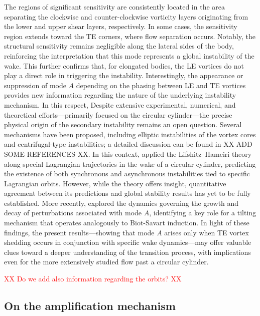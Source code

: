 %
The regions of significant sensitivity are consistently located in the area separating the clockwise and counter-clockwise vorticity layers originating from the lower and upper shear layers, respectively. In some cases, the sensitivity region extends toward the TE corners, where flow separation occurs. Notably, the structural sensitivity remains negligible along the lateral sides of the body, reinforcing the interpretation that this mode represents a global instability of the wake. This further confirms that, for elongated bodies, the LE vortices do not play a direct role in triggering the instability.
%
Interestingly, the appearance or suppression of mode $A$ depending on the phasing between LE and TE vortices provides new information regarding the nature of the underlying instability mechanism. In this respect, Despite extensive experimental, numerical, and theoretical efforts---primarily focused on the circular cylinder---the precise physical origin of the secondary instability remains an open question. Several mechanisms have been proposed, including elliptic instabilities of the vortex cores \citep{williamson-1996,leweke-williamson-1998} and centrifugal-type instabilities; a detailed discussion can be found in \cite{thompson-etal-2001} XX ADD SOME REFERENCES XX.
%
In this context, \cite{giannetti-2015} applied the Lifshitz–Hameiri theory along special Lagrangian trajectories in the wake of a circular cylinder, predicting the existence of both synchronous and asynchronous instabilities tied to specific Lagrangian orbits. However, while the theory offers insight, quantitative agreement between its predictions and global stability results has yet to be fully established. More recently, \cite{aleksyuk-heil-2023} explored the dynamics governing the growth and decay of perturbations associated with mode $A$, identifying a key role for a tilting mechanism that operates analogously to Biot-Savart induction.
%
In light of these findings, the present results---showing that mode $A$ arises only when TE vortex shedding occurs in conjunction with specific wake dynamics---may offer valuable clues toward a deeper understanding of the transition process, with implications even for the more extensively studied flow past a circular cylinder.

\textcolor{red}{XX Do we add also information regarding the orbits? XX}


\subsection{On the amplification mechanism}

